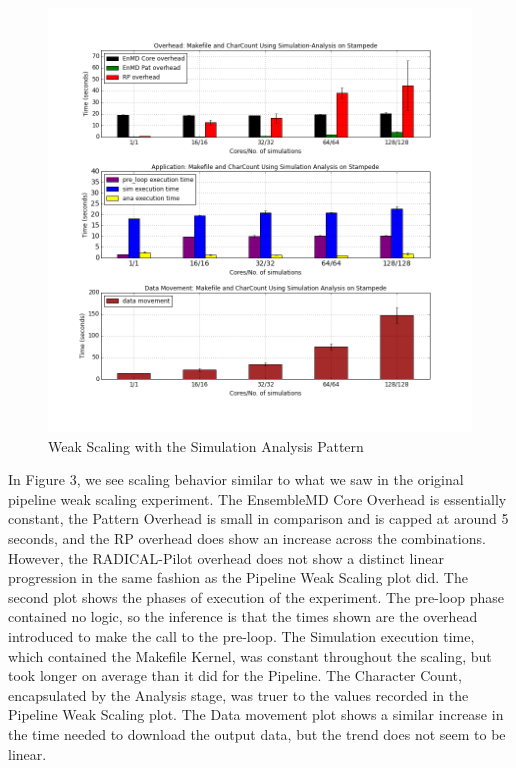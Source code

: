 \documentclass[]{article}
\begin{document}
		\begin{figure}[h!]
			\centering
			\includegraphics[scale=.30]{iteration_3/sa_weak_scaling.png}
			\caption{Weak Scaling with the Simulation Analysis Pattern}
			\label{fig:sa_weak_scaling}
		\end{figure}

		In Figure 3, we see scaling behavior similar to what we saw in the original pipeline weak scaling experiment. The EnsembleMD Core Overhead is essentially constant, the Pattern Overhead is small in comparison and is capped at around 5 seconds, and the RP overhead does show an increase across the combinations. However, the RADICAL-Pilot overhead does not show a distinct linear progression in the same fashion as the Pipeline Weak Scaling plot did. 
		The second plot shows the phases of execution of the experiment. The pre-loop phase contained no logic, so the inference is that the times shown are the overhead introduced to make the call to the pre-loop. The Simulation execution time, which contained the Makefile Kernel, was constant throughout the scaling, but took longer on average than it did for the Pipeline. The Character Count, encapsulated by the Analysis stage, was truer to the values recorded in the Pipeline Weak Scaling plot.
		The Data movement plot shows a similar increase in the time needed to download the output data, but the trend does not seem to be linear. 
\end{document}
